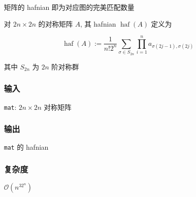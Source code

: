 矩阵的 hafnian 即为对应图的完美匹配数量

对 \(2n\times 2n\) 的对称矩阵 \(A\), 其 hafnian \(\operatorname{haf}(A)\) 定义为

\[
    \operatorname{haf}(A):=\frac{1}{n!2^n}\sum_{\sigma\in S_{2n}}\prod_{i=1}^n a_{\sigma(2j-1),\sigma(2j)}
\]

其中 \(S_{2n}\) 为 \(2n\) 阶对称群

\subsubsection*{输入}

\verb|mat|: \(2n\times 2n\) 对称矩阵

\subsubsection*{输出}

\verb|mat| 的 hafnian

\subsubsection*{复杂度}

\(\mathcal{O}(n^32^n)\)
